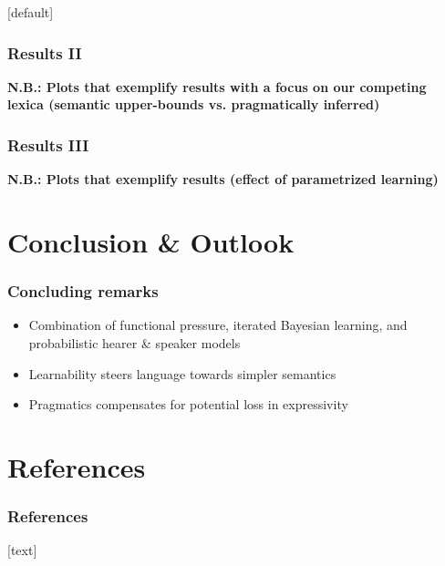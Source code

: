 \documentclass{beamer} %
\makeatletter
\newenvironment{withoutheadline}{
        \setbeamertemplate{headline}[default]
        \def\beamer@entrycode{\vspace*{-\headheight}}
    }{}
\makeatother
\begin{document}
\begin{withoutheadline}
\begin{frame}
\end{frame}




\begin{frame}
	\frametitle{Results II}

	{\bf N.B.: Plots that exemplify results with a focus on our competing lexica (semantic upper-bounds vs. pragmatically inferred)}

\end{frame}

\begin{frame}
	\frametitle{Results III}
{\bf N.B.: Plots that exemplify results (effect of parametrized learning)}

\end{frame}


\section{Conclusion \& Outlook}
\begin{frame}
	\frametitle{Concluding remarks}
\begin{itemize}\itemsep1em
		\item Combination of functional pressure, iterated Bayesian learning, and probabilistic hearer \& speaker models
		\item Learnability steers language towards simpler semantics
		\item Pragmatics compensates for potential loss in expressivity
	\end{itemize}
\end{frame}
\section[References]{References}
\begin{frame}[allowframebreaks]\frametitle{References}
\tiny
{}[text]

\end{frame}
\end{withoutheadline}
\end{document}
